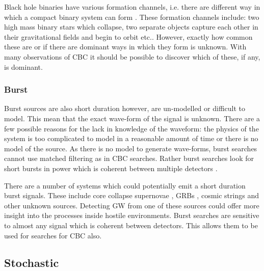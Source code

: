 Black hole binaries have various formation channels, i.e. there are different way in which a compact binary system can form \citep{}. 
These formation channels include: two high mass binary stars which collapse, two separate objects capture each other in their gravitational fields and begin to orbit etc..
However, exactly how common these are or if there are dominant ways in which they form is unknown. 
With many observations of \ac{CBC} it should be possible to discover which of these, if any, is dominant.


\subsubsection{\label{sources:transient:burst}Burst}

Burst sources are also short duration however, are un-modelled or difficult to model.
This mean that the exact wave-form of the signal is unknown.
There are a few possible reasons for the lack in knowledge of the waveform: the physics of the system is too complicated to model in a reasonable amount of time or there is no model of the source.
As there is no model to generate wave-forms, burst searches cannot use matched filtering as in \ac{CBC} searches.
Rather burst searches look for short bursts in power which is coherent between multiple detectors \citep{cornish2015BayeswaveBayesian,klimenko2008CoherentMethod}.

There are a number of systems which could potentially emit a short duration burst signals.
These include core collapse supernovae \citep{ott2008GravitationalWave}, \acp{GRB} \citep{aasi2014SearchGravitational}, cosmic strings \citep{damour2005GravitationalRadiation} and other unknown sources.
Detecting \ac{GW} from one of these sources could offer more insight into the processes inside hostile environments.
Burst searches are sensitive to almost any signal which is coherent between detectors. 
This allows them to be used for searches for \ac{CBC} also.



\subsection{Stochastic}

